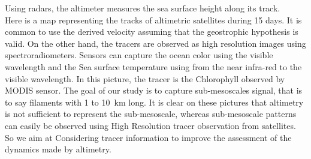 \documentclass[compress,slidescentered,notes=hide]{beamer}
\begin{document}
\begin{frame}
{Using radars, the altimeter measures the sea surface height along its track. \\
Here is a map representing the tracks of altimetric satellites during 15 days.
It is common to use the derived velocity assuming that the geostrophic hypothesis is valid.
On the other hand, the tracers are observed as high resolution images using spectroradiometers.
Sensors can capture the ocean color using the visible wavelength and the Sea surface temperature using from the near infra-red to the visible wavelength. 
In this picture, the tracer is the Chlorophyll observed by MODIS sensor. 
The goal of our study is to capture sub-mesoscales signal, that is to say filaments with 1 to 10~km long. 
It is clear on these pictures that altimetry is not sufficient to represent the sub-mesoscale, whereas sub-mesoscale patterns can easily be observed using High Resolution tracer observation from satellites. 
So we aim at Considering tracer information to improve the assessment of the dynamics made by altimetry. 
}
\end{frame}
\end{document}
